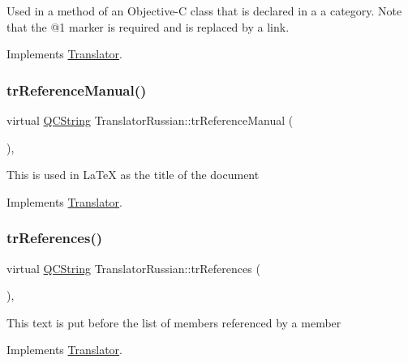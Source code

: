 Used in a method of an Objective-\/C class that is declared in a a category. Note that the @1 marker is required and is replaced by a link. 

Implements \mbox{\hyperlink{class_translator}{Translator}}.

\mbox{\label{class_translator_russian_a1ba454618da65c34e2c6ed86c3808240}} 
\subsubsection{\texorpdfstring{trReferenceManual()}{trReferenceManual()}}
{\footnotesize\ttfamily virtual \mbox{\hyperlink{class_q_c_string}{Q\+C\+String}} Translator\+Russian\+::tr\+Reference\+Manual (\begin{DoxyParamCaption}{ }\end{DoxyParamCaption})\hspace{0.3cm}{\ttfamily [inline]}, {\ttfamily [virtual]}}

This is used in La\+TeX as the title of the document 

Implements \mbox{\hyperlink{class_translator}{Translator}}.

\mbox{\label{class_translator_russian_a6af434464a7d47edc0e7877cbe394be3}} 
\subsubsection{\texorpdfstring{trReferences()}{trReferences()}}
{\footnotesize\ttfamily virtual \mbox{\hyperlink{class_q_c_string}{Q\+C\+String}} Translator\+Russian\+::tr\+References (\begin{DoxyParamCaption}{ }\end{DoxyParamCaption})\hspace{0.3cm}{\ttfamily [inline]}, {\ttfamily [virtual]}}

This text is put before the list of members referenced by a member 

Implements \mbox{\hyperlink{class_translator}{Translator}}.

\mbox{\label{class_translator_russian_a137dc46803c003b5c07c70b3997d6d2b}} 
